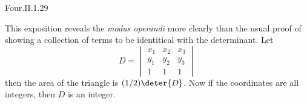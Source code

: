 \begin{ans}{Four.II.1.29}
\begin{exparts}
        This exposition reveals the \textit{modus operandi} more clearly
        than the usual proof of showing a collection of terms to be identitical
        with the determinant.
       \partsitem  \answerasgiven %
        Let
        \begin{equation*}
          D=
          \begin{vmatrix}
            x_1  &x_2  &x_3  \\
            y_1  &y_2  &y_3  \\
            1    &1    &1
          \end{vmatrix}
        \end{equation*}
        then the area of the triangle is $(1/2)\deter{D}$.
        Now if the coordinates are all integers, then $D$ is an integer.
      \end{exparts}
    
\end{ans}
